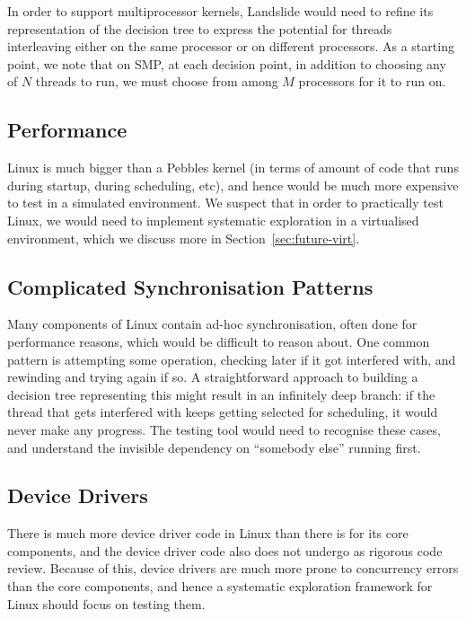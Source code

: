 In order to support multiprocessor kernels, Landslide would need to refine its representation of the decision tree to express the potential for threads interleaving either on the same processor or on different processors. As a starting point, we note that on SMP, at each decision point, in addition to choosing any of $N$ threads to run, we must choose from among $M$ processors for it to run on.

\subsection{Performance}

Linux is much bigger than a Pebbles kernel (in terms of amount of code that runs during startup, during scheduling, etc), and hence would be much more expensive to test in a simulated environment. We suspect that in order to practically test Linux, we would need to implement systematic exploration in a virtualised environment, which we discuss more in Section~\ref{sec:future-virt}.

\subsection{Complicated Synchronisation Patterns}

Many components of Linux contain ad-hoc synchronisation, often done for performance reasons, which would be difficult to reason about. One common pattern is attempting some operation, checking later if it got interfered with, and rewinding and trying again if so. A straightforward approach to building a decision tree representing this might result in an infinitely deep branch: if the thread that gets interfered with keeps getting selected for scheduling, it would never make any progress. The testing tool would need to recognise these cases, and understand the invisible dependency on ``somebody else'' running first.

\subsection{Device Drivers}
\label{sec:future-drivers}

There is much more device driver code in Linux than there is for its core components, and the device driver code also does not undergo as rigorous code review. Because of this, device drivers are much more prone to concurrency errors than the core components, and hence a systematic exploration framework for Linux should focus on testing them.

